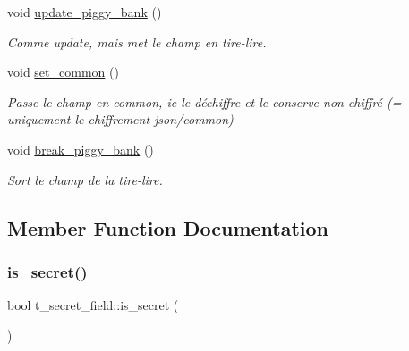 \begin{DoxyCompactItemize}
\mbox{\label{classt__secret__field_a4a012b5da8f1504469b26d6d2be3cdc0}} 
void \hyperlink{classt__secret__field_a4a012b5da8f1504469b26d6d2be3cdc0}{update\+\_\+piggy\+\_\+bank} ()
\begin{DoxyCompactList}\small\item\em Comme update, mais met le champ en tire-\/lire. \end{DoxyCompactList}\item 
\mbox{\label{classt__secret__field_ac36b9174e0860595c19905b2ae79e54a}} 
void \hyperlink{classt__secret__field_ac36b9174e0860595c19905b2ae79e54a}{set\+\_\+common} ()
\begin{DoxyCompactList}\small\item\em Passe le champ en common, ie le déchiffre et le conserve non chiffré (= uniquement le chiffrement json/common) \end{DoxyCompactList}\item 
\mbox{\label{classt__secret__field_a200459a052ae67d9b875079fc6933d62}} 
void \hyperlink{classt__secret__field_a200459a052ae67d9b875079fc6933d62}{break\+\_\+piggy\+\_\+bank} ()
\begin{DoxyCompactList}\small\item\em Sort le champ de la tire-\/lire. \end{DoxyCompactList}\end{DoxyCompactItemize}


\subsection{Member Function Documentation}
\mbox{\label{classt__secret__field_a5c3a67f7ac958289fa55dcdede86f141}} 
\subsubsection{\texorpdfstring{is\+\_\+secret()}{is\_secret()}}
{\footnotesize\ttfamily bool t\+\_\+secret\+\_\+field\+::is\+\_\+secret (\begin{DoxyParamCaption}{ }\end{DoxyParamCaption})}

